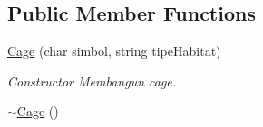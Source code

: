 \subsection*{Public Member Functions}
\begin{DoxyCompactItemize}
\item 
\hyperlink{classCage_adf3c087a1f7526422db7ce5e37469c91}{Cage} (char simbol, string tipe\-Habitat)
\begin{DoxyCompactList}\small\item\em Constructor Membangun cage. \end{DoxyCompactList}\item 
\hypertarget{classCage_a657259499dfc23c63fc65aeaf8abbb17}{\hyperlink{classCage_a657259499dfc23c63fc65aeaf8abbb17}{$\sim$\-Cage} ()}\label{classCage_a657259499dfc23c63fc65aeaf8abbb17}


\end{DoxyCompactItemize}
